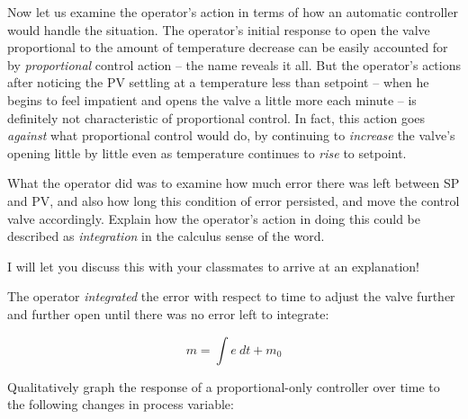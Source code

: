 \vskip 10pt

Now let us examine the operator's action in terms of how an automatic controller would handle the situation.  The operator's initial response to open the valve proportional to the amount of temperature decrease can be easily accounted for by {\it proportional} control action -- the name reveals it all.  But the operator's actions after noticing the PV settling at a temperature less than setpoint -- when he begins to feel impatient and opens the valve a little more each minute -- is definitely not characteristic of proportional control.  In fact, this action goes {\it against} what proportional control would do, by continuing to {\it increase} the valve's opening little by little even as temperature continues to {\it rise} to setpoint.

What the operator did was to examine how much error there was left between SP and PV, and also how long this condition of error persisted, and move the control valve accordingly.  Explain how the operator's action in doing this could be described as {\it integration} in the calculus sense of the word.







I will let you discuss this with your classmates to arrive at an explanation!







The operator {\it integrated} the error with respect to time to adjust the valve further and further open until there was no error left to integrate:

$$m = \int e \> dt + m_0$$






Qualitatively graph the response of a proportional-only controller over time to the following changes in process variable:

